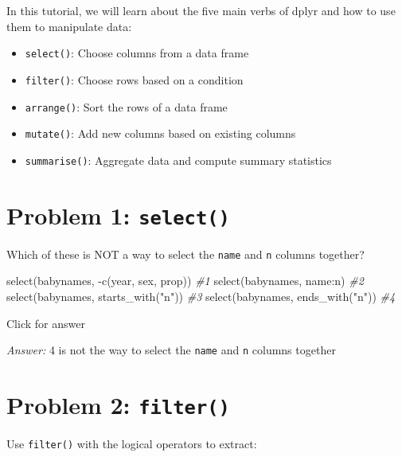 \documentclass[
]{book}
\newenvironment{Shaded}{\begin{snugshade}}{\end{snugshade}}
\newcommand{\CommentTok}[1]{\textcolor[rgb]{0.56,0.35,0.01}{\textit{#1}}}
\newcommand{\FunctionTok}[1]{\textcolor[rgb]{0.00,0.00,0.00}{#1}}
\newcommand{\NormalTok}[1]{#1}
\newcommand{\SpecialCharTok}[1]{\textcolor[rgb]{0.00,0.00,0.00}{#1}}
\newcommand{\StringTok}[1]{\textcolor[rgb]{0.31,0.60,0.02}{#1}}
\providecommand{\tightlist}{%
  \setlength{\itemsep}{0pt}\setlength{\parskip}{0pt}}
\begin{document}
In this tutorial, we will learn about the five main verbs of dplyr and how to use them to manipulate data:

\begin{itemize}
\tightlist
\item
  \texttt{select()}: Choose columns from a data frame
\item
  \texttt{filter()}: Choose rows based on a condition
\item
  \texttt{arrange()}: Sort the rows of a data frame
\item
  \texttt{mutate()}: Add new columns based on existing columns
\item
  \texttt{summarise()}: Aggregate data and compute summary statistics
\end{itemize}

\hypertarget{problem-1-select}{%
\section{\texorpdfstring{Problem 1: \texttt{select()}}{Problem 1: select()}}\label{problem-1-select}}

Which of these is NOT a way to select the \texttt{name} and \texttt{n} columns together?

\begin{Shaded}
\begin{Highlighting}[]
\FunctionTok{select}\NormalTok{(babynames, }\SpecialCharTok{{-}}\FunctionTok{c}\NormalTok{(year, sex, prop))  }\CommentTok{\#1}
\FunctionTok{select}\NormalTok{(babynames, name}\SpecialCharTok{:}\NormalTok{n)   }\CommentTok{\#2}
\FunctionTok{select}\NormalTok{(babynames, }\FunctionTok{starts\_with}\NormalTok{(}\StringTok{"n"}\NormalTok{)) }\CommentTok{\#3}
\FunctionTok{select}\NormalTok{(babynames, }\FunctionTok{ends\_with}\NormalTok{(}\StringTok{"n"}\NormalTok{))  }\CommentTok{\#4}
\end{Highlighting}
\end{Shaded}

Click for answer

\emph{Answer:} 4 is not the way to select the \texttt{name} and \texttt{n} columns together

\hypertarget{problem-2-filter}{%
\section{\texorpdfstring{Problem 2: \texttt{filter()}}{Problem 2: filter()}}\label{problem-2-filter}}

Use \texttt{filter()} with the logical operators to extract:
\end{document}
